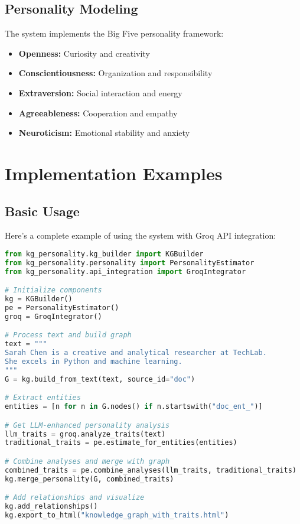 \documentclass[11pt]{article}
\begin{document}
\subsection{Personality Modeling}
The system implements the Big Five personality framework:

\begin{itemize}[label=$\bullet$]
    \item \textbf{Openness:} Curiosity and creativity
    \item \textbf{Conscientiousness:} Organization and responsibility
    \item \textbf{Extraversion:} Social interaction and energy
    \item \textbf{Agreeableness:} Cooperation and empathy
    \item \textbf{Neuroticism:} Emotional stability and anxiety
\end{itemize}

\section{Implementation Examples}

\subsection{Basic Usage}
Here's a complete example of using the system with Groq API integration:

\begin{lstlisting}[language=Python, caption=Enhanced Usage Example]
from kg_personality.kg_builder import KGBuilder
from kg_personality.personality import PersonalityEstimator
from kg_personality.api_integration import GroqIntegrator

# Initialize components
kg = KGBuilder()
pe = PersonalityEstimator()
groq = GroqIntegrator()

# Process text and build graph
text = """
Sarah Chen is a creative and analytical researcher at TechLab.
She excels in Python and machine learning.
"""
G = kg.build_from_text(text, source_id="doc")

# Extract entities
entities = [n for n in G.nodes() if n.startswith("doc_ent_")]

# Get LLM-enhanced personality analysis
llm_traits = groq.analyze_traits(text)
traditional_traits = pe.estimate_for_entities(entities)

# Combine analyses and merge with graph
combined_traits = pe.combine_analyses(llm_traits, traditional_traits)
kg.merge_personality(G, combined_traits)

# Add relationships and visualize
kg.add_relationships()
kg.export_to_html("knowledge_graph_with_traits.html")
\end{lstlisting}
\end{document}
